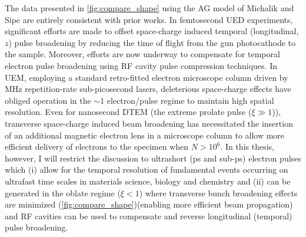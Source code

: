 The data presented in \ref{fig:compare_shape} using the AG model of Michalik and Sipe \cite{michalik_analytic_2006} are entirely consistent with prior works.\cite{reed_femtosecond_2006,siwick_ultrafast_2002}
In femtosecond UED experiments, significant efforts are made to offset space-charge induced temporal (longitudinal, $z$) pulse broadening by reducing the time of flight from the gun photocathode to the sample.\cite{siwick_ultrafast_2002,reed_evolution_2009}
Moreover, efforts are now underway to compensate for temporal electron pulse broadening using RF cavity pulse compression techniques.\cite{oudheusden_electron_2007}
In UEM, employing a standard retro-fitted electron microscope column driven by MHz repetition-rate sub-picosecond lasers,\cite{lobastov_four-dimensional_2005} deleterious space-charge effects have obliged operation in the $\sim$1 electron/pulse regime to maintain high spatial resolution.
Even for nanosecond DTEM (the extreme prolate pulse ($\xi \gg 1 $)), transverse space-charge induced beam broadening has necessitated the insertion of an additional magnetic electron lens in a microscope column to allow more efficient delivery of electrons to the specimen when $ N > 10^{6} $.\cite{lagrange_nanosecond_2008}
In this thesis, however, I will restrict the discussion to ultrashort (ps and sub-ps) electron pulses which (i) allow for the temporal resolution of fundamental events occurring on ultrafast time scales in materials science, biology and chemistry \cite{king_ultrafast_2005} and (ii) can be generated in the oblate regime ($ \xi < 1 $) where transverse bunch broadening effects are minimized (\ref{fig:compare_shape})(enabling more efficient beam propagation) and RF cavities can be used to compensate and reverse longitudinal (temporal) pulse broadening.\cite{veisz_hybrid_2007}

